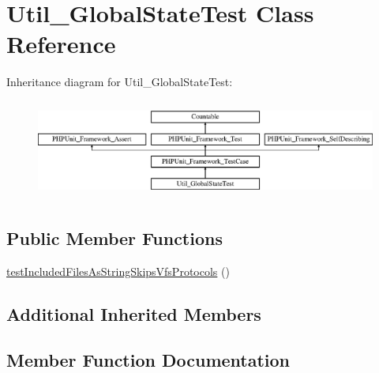 \hypertarget{class_util___global_state_test}{}\section{Util\+\_\+\+Global\+State\+Test Class Reference}
\label{class_util___global_state_test}
Inheritance diagram for Util\+\_\+\+Global\+State\+Test\+:\begin{figure}[H]
\begin{center}
\leavevmode
\includegraphics[height=3.303835cm]{class_util___global_state_test}
\end{center}
\end{figure}
\subsection*{Public Member Functions}
\begin{DoxyCompactItemize}
\item 
\mbox{\hyperlink{class_util___global_state_test_a4b707d8e7a7bb65b1d3c6117aa07249b}{test\+Included\+Files\+As\+String\+Skips\+Vfs\+Protocols}} ()
\end{DoxyCompactItemize}
\subsection*{Additional Inherited Members}


\subsection{Member Function Documentation}
\mbox{\label{class_util___global_state_test_a4b707d8e7a7bb65b1d3c6117aa07249b}} 
